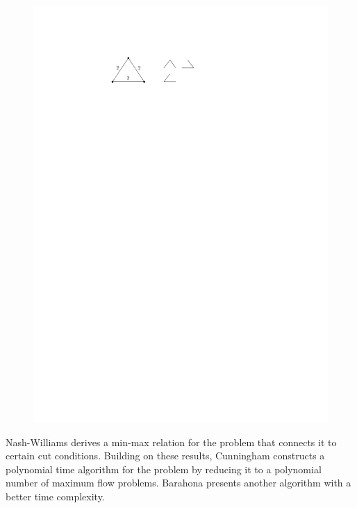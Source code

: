 \begin{figure}[htpb]
\centering
\includegraphics[scale=1]{chapter-6-NTP/stp-example}
\caption{}
\label{fig_spt_example}
\end{figure}
Nash-Williams \cite{Nash-Williams1961} derives a min-max relation for the problem that connects it to certain cut conditions.
Building on these results, Cunningham \cite{Cunningham1985} constructs a polynomial time 
algorithm for the problem by reducing it to a polynomial number of maximum flow problems.
Barahona \cite{Barahona1995} presents another algorithm with a better time complexity.

